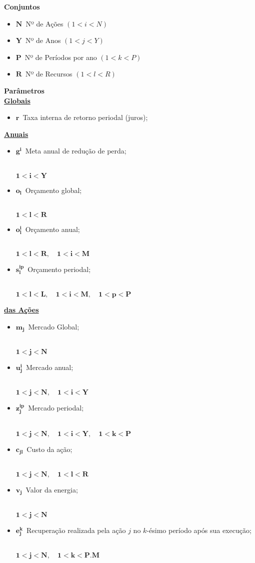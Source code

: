 \documentclass{article}
\newcommand{\topico}[1]{
  \vspace{10pt}
  {\Large \bf #1 }
  \\
}
\newcommand{\subtopico}[1]{
  \vspace{6pt}
  {\large \bf \underline{#1}}
  \\
}
\newcommand{\variavel}[1]{
  { \Large $ \bm{ #1 } \, $}
}
\newcommand{\decorator}[1]{
  {\\ \scriptsize \hspace*{12pt} $ \bm{ #1 } $ }
}
\begin{document}
\topico{Conjuntos}

\begin{itemize}
  \item \variavel{N} Nº de Ações {\scriptsize $(1 < i < N) $}
  \item \variavel{Y} Nº de Anos  {\scriptsize $(1 < j < Y) $}
  \item \variavel{P} Nº de Períodos por ano {\scriptsize $(1 < k < P)$}
  \item \variavel{R} Nº de Recursos {\scriptsize $(1 < l < R)$}
\end{itemize}

\topico{Parâmetros}

\subtopico{Globais}
\begin{itemize}
  \item \variavel{r} Taxa interna de retorno periodal (juros);
\end{itemize}

\subtopico{Anuais}
\begin{itemize}
  \item \variavel{g^i} Meta anual de redução de perda;
    \decorator{1 < i < Y}
  \item \variavel{o_l} Orçamento global;
    \decorator{1 < l < R}
  \item \variavel{o_l^i} Orçamento anual;
    \decorator{1 < l < R, \quad 1 < i < M}
  \item \variavel{s_l^{ip}} Orçamento periodal;
    \decorator{1 < l < L, \quad 1 < i < M, \quad 1 < p < P}
\end{itemize}

\subtopico{das Ações}
\begin{itemize}
  \item \variavel{m_j} Mercado Global;
    \decorator{1 < j < N}
  \item \variavel{u_j^i} Mercado anual;
    \decorator{1 < j < N, \quad 1 < i < Y}
  \item \variavel{z_j^{ip}} Mercado periodal;
    \decorator{1 < j < N, \quad 1 < i < Y, \quad 1 < k < P}
  \item \variavel{c_{jl}} Custo da ação;
    \decorator{1 < j < N, \quad 1 < l < R}
  \item \variavel{v_j} Valor da energia;
    \decorator{1 < j < N}
  \item \variavel{e_j^k} Recuperação realizada pela ação $j$ no $k$-ésimo período
    após sua execução;
    \decorator{1 < j < N, \quad 1 < k < P.M}
\end{itemize}
\end{document}
